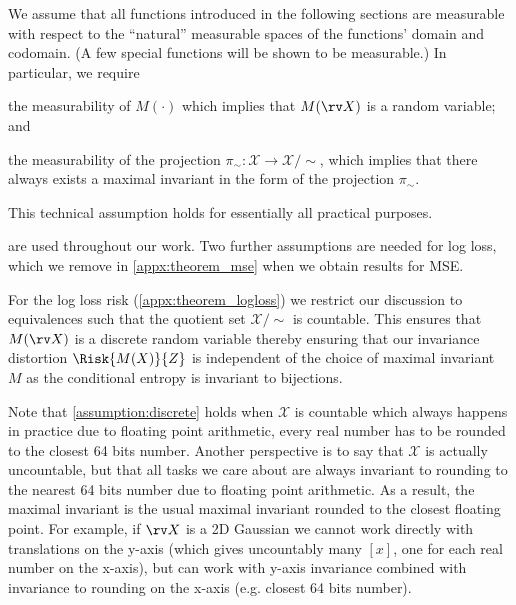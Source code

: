\documentclass[final]{article}
\begin{document}
\begin{assumption} \label{assumption:measurability} 
We assume that all functions introduced in the following sections are measurable with respect to the ``natural'' measurable spaces of the functions' domain and codomain. (A few special functions will be shown to be measurable.) 
In particular, we require 
\begin{inlinelist}
\item the measurability of $M(\cdot)$ which implies that $M(\rv X)$ is a random variable; and
\item the measurability of the projection $\pi_{\sim}: \mathcal{X} \to \mathcal{X}/\sim$, which implies that there always exists a maximal invariant in the form of the projection $\pi_{\sim}$. 
\end{inlinelist}
This technical assumption holds for essentially all practical purposes.
\end{assumption}



 are used throughout our work.
Two further assumptions are needed for log loss, which we remove in \cref{appx:theorem_mse} when we obtain results for MSE.

\begin{assumption} 
\label{assumption:discrete} 
For the log loss risk (\cref{appx:theorem_logloss}) we restrict our discussion to equivalences  such that the quotient set $\mathcal{X}/\sim$ is countable.
This ensures that $M(\rv X)$ is a discrete random variable thereby ensuring that our invariance distortion $\Risk{M(X)}{Z}$ is independent of the choice of maximal invariant $M$ as the conditional entropy is  invariant to bijections.
\end{assumption}

Note that \cref{assumption:discrete}  holds when $\mathcal X$ is countable which always happens in practice due to floating point arithmetic, \ie every real number has to be rounded to the closest 64 bits number.
Another perspective is to say that $\mathcal{X}$ is actually uncountable, but that all tasks we care about are always invariant to rounding to the nearest 64 bits number due to floating point arithmetic.
As a result, the maximal invariant is the usual maximal invariant rounded to the closest floating point. 
For example, if $\rv X$ is a 2D Gaussian we cannot work directly with translations on the y-axis (which gives uncountably many $[x]$, one for each real number on the x-axis), but can work with y-axis invariance combined with invariance to rounding on the x-axis (e.g. closest 64 bits number).
\end{document}
